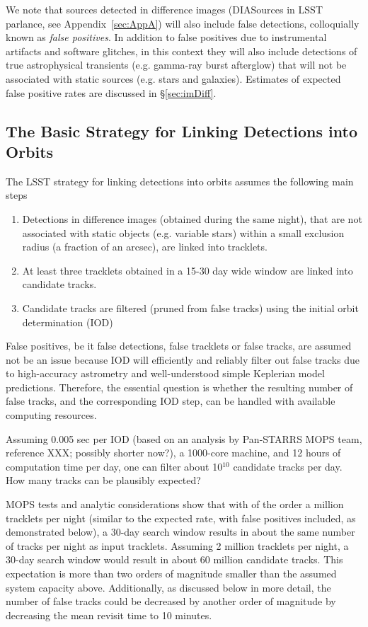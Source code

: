 We note that sources detected in difference images (DIASources in LSST parlance, see Appendix~\ref{sec:AppA})
will also include false detections, colloquially known as {\it false positives}. 
In addition to false positives due to instrumental artifacts and software glitches, 
in this context they will also include detections of true astrophysical transients 
(e.g. gamma-ray burst afterglow) that will not be associated with static sources
(e.g. stars and galaxies). Estimates of expected false positive rates are discussed
in \S\ref{sec:imDiff}. 



\subsection{The Basic Strategy for Linking Detections into Orbits} 

The LSST strategy for linking detections into orbits assumes the following main steps
\begin{enumerate}
\item Detections in difference images (obtained during the same night), that are not 
    associated with static objects (e.g. variable stars) within a small exclusion radius 
    (a fraction of an arcsec), are linked into tracklets.
\item At least three tracklets obtained in a 15-30 day wide window are linked into 
         candidate tracks.
\item Candidate tracks are filtered (pruned from false tracks) using the initial orbit 
         determination (IOD) 
\end{enumerate}

False positives, be it false detections, false tracklets or false tracks, are assumed not be 
an issue because IOD will efficiently and reliably filter out false tracks due to high-accuracy 
astrometry and well-understood simple Keplerian model predictions. Therefore, the 
essential question is whether the resulting number of false tracks, and the corresponding
IOD step, can be handled with available computing resources.

Assuming 0.005 sec per IOD (based on an analysis by Pan-STARRS MOPS team,
reference XXX; possibly shorter now?), a 1000-core machine, and 12 hours of computation 
time per day, one can filter about 10$^{10}$ candidate tracks per day. How many tracks 
can be plausibly expected? 

MOPS tests and analytic considerations show that with of the order a 
million tracklets per night (similar to the expected rate, with false positives included, 
as demonstrated below), a 30-day search window results in about the same number of 
tracks per night as input tracklets. Assuming 2 million tracklets per night, a 30-day 
search window would result in about 60 million candidate tracks. This expectation is more 
than two orders of magnitude smaller than the assumed system capacity above. Additionally, 
as discussed below in more detail, the number of false tracks could be decreased by another 
order of magnitude by decreasing the mean revisit time to 10 minutes. 


